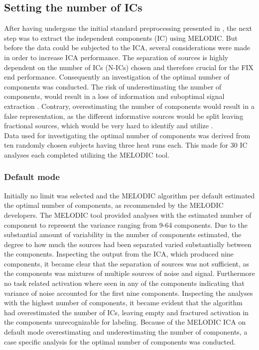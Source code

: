 
\subsection{Setting the number of ICs}

After having undergone the initial standard preprocessing presented in , the next step was to extract the independent components (IC) using MELODIC. But before the data could be subjected to the ICA, several considerations were made in order to increase ICA performance. The separation of sources is highly dependent on the number of ICs (N-ICs) chosen and therefore crucial for the FIX end performance. Consequently an investigation of the optimal number of components was conducted. The risk of underestimating the number of components, would result in a loss of information and suboptimal signal extraction \cite{Beckmann2004}. Contrary, overestimating the number of components would result in a false representation, as the different informative sources would be split leaving fractional sources, which would be very hard to identify and utilize \cite{Beckmann2004,Li2007}. \\
Data used for investigating the optimal number of components was derived from ten randomly chosen subjects having three heat runs each. This made for 30 IC analyses each completed utilizing the MELODIC tool. 


\subsubsection{Default mode}
Initially no limit was selected and the MELODIC algorithm per default estimated the optimal number of components, as recommended by the MELODIC developers. \cite{FMRIB2016} The MELODIC tool provided analyses with the estimated number of component to represent the variance ranging from 9-64 components. Due to the substantial amount of variability in the number of components estimated, the degree to how much the sources had been separated varied substantially between the components. Inspecting the output from the ICA, which produced nine components, it became clear that the separation of sources was not sufficient, as the components was mixtures of multiple sources of noise and signal. Furthermore no task related activation where seen in any of the components indicating that variance of noise accounted for the first nine components. Inspecting the analyses with the highest number of components, it became evident that the algorithm had overestimated the number of ICs, leaving empty and fractured activation in the components unrecognizable for labeling. Because of the MELODIC ICA on default mode overestimating and underestimating the number of components, a case specific analysis for the optimal number of components was conducted. 

